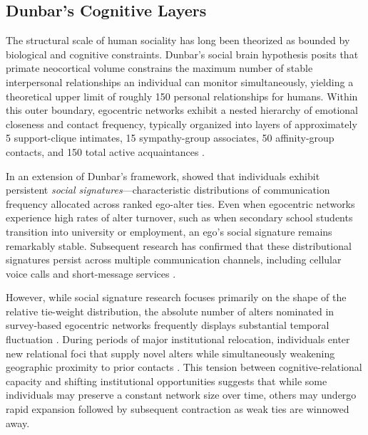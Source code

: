 \documentclass[12pt]{article}
\begin{document}
\subsection{Dunbar's Cognitive Layers}

The structural scale of human sociality has long been theorized as bounded by biological and cognitive constraints. Dunbar's \citeyearpar{dunbar1992neocortex, dunbar1998social} social brain hypothesis posits that primate neocortical volume constrains the maximum number of stable interpersonal relationships an individual can monitor simultaneously, yielding a theoretical upper limit of roughly 150 personal relationships for humans. Within this outer boundary, egocentric networks exhibit a nested hierarchy of emotional closeness and contact frequency, typically organized into layers of approximately 5 support-clique intimates, 15 sympathy-group associates, 50 affinity-group contacts, and 150 total active acquaintances \citep{dunbar2018anatomy, hill2003social, zhou2005discrete}.

In an extension of Dunbar's framework, \citet{saramaki2014persistence} showed that individuals exhibit persistent \emph{social signatures}---characteristic distributions of communication frequency allocated across ranked ego-alter ties. Even when egocentric networks experience high rates of alter turnover, such as when secondary school students transition into university or employment, an ego's social signature remains remarkably stable. Subsequent research has confirmed that these distributional signatures persist across multiple communication channels, including cellular voice calls and short-message services \citep{heydari2018multichannel}.

However, while social signature research focuses primarily on the shape of the relative tie-weight distribution, the absolute number of alters nominated in survey-based egocentric networks frequently displays substantial temporal fluctuation \citep{bidart2018personal, small2015how}. During periods of major institutional relocation, individuals enter new relational foci that supply novel alters while simultaneously weakening geographic proximity to prior contacts \citep{feld1982social, hachen2022generators-7f6, lomi2014social-e4f}. This tension between cognitive-relational capacity and shifting institutional opportunities suggests that while some individuals may preserve a constant network size over time, others may undergo rapid expansion followed by subsequent contraction as weak ties are winnowed away.
\end{document}
